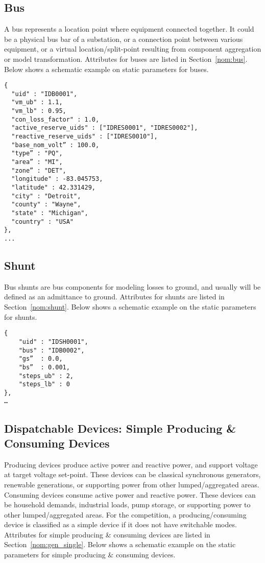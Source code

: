 \subsection{Bus}
\label{sec:bus}
A bus represents a location point where equipment connected together.
It could be a physical bus bar of a substation, or 
a connection point between various equipment, 
or a virtual location/split-point resulting from
component aggregation or model transformation.
Attributes for buses are listed in Section~\ref{nom:bus}.
Below shows a schematic example on static parameters for buses.
\begin{verbatim}
{
  "uid" : "IDB0001",
  "vm_ub" : 1.1,
  "vm_lb" : 0.95,
  "con_loss_factor" : 1.0,
  "active_reserve_uids" : ["IDRES0001", "IDRES0002"],
  "reactive_reserve_uids" : ["IDRES0010"],
  "base_nom_volt” : 100.0,
  "type” : "PQ",
  "area” : "MI",
  "zone” : "DET",
  "longitude" : -83.045753,
  "latitude" : 42.331429,
  "city" : "Detroit",
  "county" : "Wayne",
  "state" : "Michigan",
  "country" : "USA"
},
...
\end{verbatim}


\subsection{Shunt}
\label{sec:shunt}
Bus shunts are bus components for modeling losses to ground, and 
usually will be defined as an admittance to ground.
Attributes for shunts are listed in Section~\ref{nom:shunt}.
Below shows a schematic example on the static parameters for shunts.
\begin{verbatim}
{
    "uid" : "IDSH0001",
    "bus" : "IDB0002",
    "gs”  : 0.0,
    "bs”  : 0.001,
    "steps_ub" : 2,
    "steps_lb" : 0
},
…    
\end{verbatim}


\subsection{Dispatchable Devices: Simple Producing \& Consuming Devices}
\label{sec:generator}
Producing devices
produce active power and reactive power, and support voltage at target voltage set-point.
These devices can be classical synchronous generators, renewable generations, or supporting 
power from other lumped/aggregated areas. 
Consuming devices consume active power and reactive power.
These devices can be household demands, industrial loads, pump storage, or
supporting power to other lumped/aggregated areas. 
For the competition, a producing/consuming device is classified as a simple device if it
does not have switchable modes.
Attributes for simple producing \& consuming devices are listed in Section~\ref{nom:gen_single}.
Below shows a schematic example on the static parameters for simple producing \& consuming devices.

